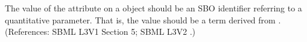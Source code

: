The value of the attribute  on a \Parameter object should be
an SBO identifier referring to a quantitative parameter.  That is, the
value should be a term derived from \sboparameter.  (References: SBML L3V1 Section 5; SBML
 L3V2 .)
